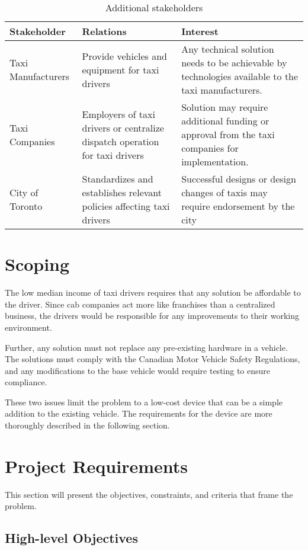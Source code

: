 \documentclass[11pt]{article}
\begin{document}
\begin{table}[h]
  \centering
  \caption{Additional stakeholders}
    \begin{tabular}{ l p{5cm} p{5cm}}
    Stakeholder & Relations &	Interest \\ \hline
    Taxi Manufacturers & Provide vehicles and equipment for taxi drivers	& 
    Any technical solution needs to be achievable by technologies available 
    to the taxi manufacturers. \\ 
    Taxi Companies & Employers of taxi drivers or centralize dispatch 
    operation for taxi drivers	& Solution may require additional funding 
    or approval from the taxi companies for implementation. \\
    City of Toronto & Standardizes and establishes relevant policies 
    affecting taxi drivers \cite{CityofToronto}	& Successful designs or design changes of  
    taxis may require endorsement by the city  \\
    \end{tabular}
\end{table}
\clearpage
\section{Scoping}
The low median income of taxi drivers\cite{iTaxiWorkers2012} requires
that any solution be affordable to the driver. Since cab companies act
more like franchises than a centralized business, the drivers would be
responsible for any improvements to their working environment. 

Further, any solution must not replace any pre-existing hardware in a
vehicle. The solutions must comply with the Canadian Motor Vehicle
Safety Regulations\cite{motorregs}, and any modifications to the base
vehicle would require testing to ensure compliance. 

These two issues limit the problem to a low-cost device that can be a
simple addition to the existing vehicle. The requirements for the
device are more thoroughly described in the following section.
\section{Project Requirements}
\label{sec:requirements}
This section will present the objectives, constraints, and criteria 
that frame the problem.

\subsection{High-level Objectives}
\label{sec:high-level-objectives}
\end{document}
